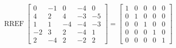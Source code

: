 \begin{exerciseAnswer} 


\[\operatorname{RREF} \left[\begin{array}{ccccc}
0 & -1 & 0 & -4 & 0 \\
4 & 2 & 4 & -3 & -5 \\
1 & 1 & -4 & -4 & -3 \\
-2 & 3 & 2 & -4 & 1 \\
2 & -4 & 2 & -2 & 2
\end{array}\right] = \left[\begin{array}{ccccc}
1 & 0 & 0 & 0 & 0 \\
0 & 1 & 0 & 0 & 0 \\
0 & 0 & 1 & 0 & 0 \\
0 & 0 & 0 & 1 & 0 \\
0 & 0 & 0 & 0 & 1
\end{array}\right] \]



\end{exerciseAnswer}
